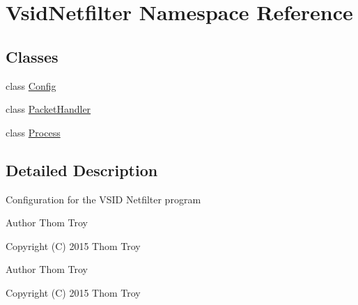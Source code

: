 \hypertarget{namespace_vsid_netfilter}{\section{Vsid\-Netfilter Namespace Reference}
\label{namespace_vsid_netfilter}
}
\subsection*{Classes}
\begin{DoxyCompactItemize}
\item 
class \hyperlink{class_vsid_netfilter_1_1_config}{Config}
\item 
class \hyperlink{class_vsid_netfilter_1_1_packet_handler}{Packet\-Handler}
\item 
class \hyperlink{class_vsid_netfilter_1_1_process}{Process}
\end{DoxyCompactItemize}


\subsection{Detailed Description}
Configuration for the V\-S\-I\-D Netfilter program

\begin{DoxyAuthor}{Author}
Thom Troy
\end{DoxyAuthor}
Copyright (C) 2015 Thom Troy

\begin{DoxyAuthor}{Author}
Thom Troy
\end{DoxyAuthor}
Copyright (C) 2015 Thom Troy 